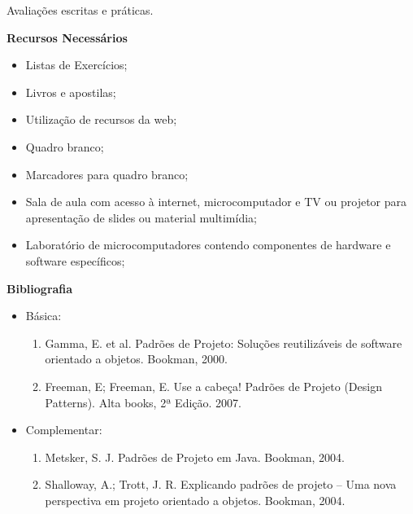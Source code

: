 \noindent
   Avaliações escritas e práticas.

\begin{snugshade}\begin{center}\textbf{
    Recursos Necessários
    \vphantom{q} %
}\end{center}\end{snugshade}

\begin{itemize} 
  \item Listas de Exercícios;
    \item Livros e apostilas;
    \item Utilização de recursos da web;
    \item Quadro branco;
    \item Marcadores para quadro branco;
    \item Sala de aula com acesso à internet, microcomputador e TV ou projetor para apresentação de slides ou material multimídia;
    \item Laboratório de microcomputadores contendo componentes de hardware e software específicos;
\end{itemize}



\begin{snugshade}\begin{center}\textbf{
    Bibliografia
}\end{center}\end{snugshade}

\begin{itemize} 
  \item Básica:
	\begin{enumerate}
	\item Gamma, E. et al. Padrões de Projeto: Soluções reutilizáveis de software orientado a objetos. Bookman, 2000.
	\item Freeman, E; Freeman, E. Use a cabeça! Padrões de Projeto (Design Patterns). Alta books, 2ª Edição. 2007.      
	\end{enumerate}
  \item Complementar:
	\begin{enumerate} 
	\item Metsker, S. J. Padrões de Projeto em Java. Bookman, 2004.
	\item Shalloway, A.; Trott, J. R. Explicando padrões de projeto – Uma nova perspectiva em projeto orientado a objetos. Bookman, 2004.
	\end{enumerate}
\end{itemize}
